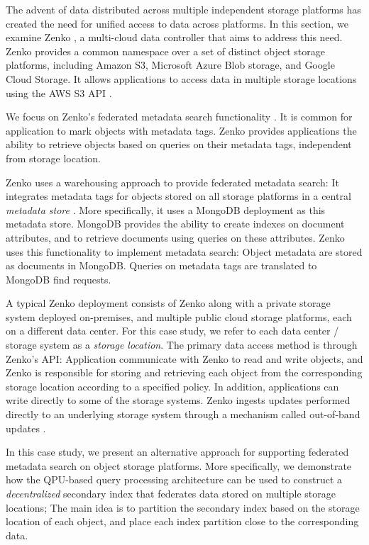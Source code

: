 The advent of data distributed across multiple independent storage platforms has created the need for unified access to data across platforms.
In this section, we examine Zenko \cite{zenko:docs}, a multi-cloud data controller that aims to address this need.
Zenko provides a common namespace over a set of distinct object storage platforms,
including Amazon S3, Microsoft Azure Blob storage, and Google Cloud Storage.
It allows applications to access data in multiple storage locations using the AWS S3 API \cite{aws:s3}.

We focus on Zenko's federated metadata search functionality \cite{zenko:mdsearch}.
It is common for application to mark objects with metadata tags.
Zenko provides applications the ability to retrieve objects based on queries on their metadata tags,
independent from storage location.

Zenko uses a warehousing approach to provide federated metadata search:
It integrates metadata tags for objects stored on all storage platforms in a central \textit{metadata store} \cite{zenko:architecture, zenko:mongodb}.
More specifically, it uses a MongoDB deployment as this metadata store.
MongoDB provides the ability to create indexes on document attributes,
and to retrieve documents using queries on these attributes.
Zenko uses this functionality to implement metadata search:
Object metadata are stored as documents in MongoDB.
Queries on metadata tags are translated to MongoDB find requests.

A typical Zenko deployment consists of Zenko along with a private storage system deployed on-premises,
and multiple public cloud storage platforms, each on a different data center.
For this case study, we refer to each data center / storage system as a \textit{storage location}.
The primary data access method is through Zenko's API:
Application communicate with Zenko to read and write objects,
and Zenko is responsible for storing and retrieving each object from the corresponding storage location according to a specified policy.
In addition,
applications can write directly to some of the storage systems.
Zenko ingests updates performed directly to an underlying storage system through a mechanism called out-of-band updates \cite{zenko:outofband}.

In this case study,
we present an alternative approach for supporting federated metadata search on object storage platforms.
More specifically, we demonstrate how the QPU-based query processing architecture can be used to construct
a \textit{decentralized} secondary index that federates data stored on multiple storage locations;
The main idea is to partition the secondary index based on the storage location of each object,
and place each index partition close to the corresponding data.

